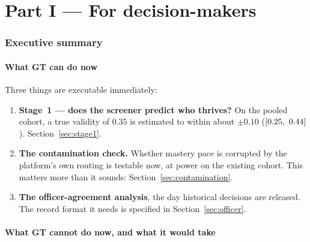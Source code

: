 \documentclass[11pt,a4paper]{article}
\begin{document}
\tableofcontents
\clearpage

\part*{Part I --- For decision-makers}

\section{Executive summary}
\label{sec:exec}

\subsection{What GT can do now}


Three things are executable immediately:

\begin{enumerate}[leftmargin=1.4em,itemsep=0.3em]
\item \textbf{Stage~1 --- does the screener predict who thrives?} On the pooled
cohort, a true validity of $0.35$ is estimated to within about $\pm0.10$
($[0.25,\ 0.44]$). Section~\ref{sec:stage1}.
\item \textbf{The contamination check.} Whether mastery pace is corrupted by the
platform's own routing is testable now, at power \PowerBothContam{} on the
existing cohort. This matters more than it sounds:
Section~\ref{sec:contamination}.
\item \textbf{The officer-agreement analysis}, the day historical decisions are
released. The record format it needs is specified in Section~\ref{sec:officer}.
\end{enumerate}

\subsection{What GT cannot do now, and what it would take}
\label{sec:exec-constraint}
\end{document}
